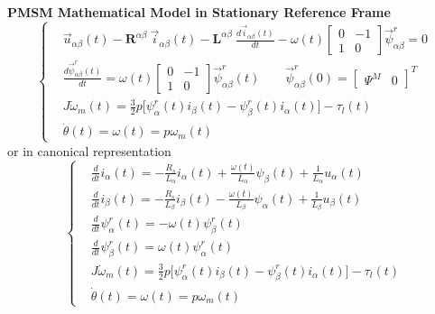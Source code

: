 \documentclass[12pt,a4paper,oneside]{book}
\begin{document}
\begin{onehalfspace}
\begin{mybox}
	\textbf{PMSM Mathematical Model in Stationary Reference Frame}
	\begin{equation}\label{twophase_model_ref}
		\left\lbrace \begin{aligned}
			& \vec{u}_{\alpha\beta}(t)-\mathbf{R}^{\alpha\beta}\ 
			\vec{i}_{\alpha\beta}(t)-\mathbf{L}^{\alpha\beta}\ 
			\frac{d\vec{i}_{\alpha\beta}(t)}{dt}-\omega(t) \begin{bmatrix} 
				0 & -1 \\ 1 & 0\end{bmatrix} \vec{\psi}^r_{\alpha\beta} = 0 
			\\[6pt]
			& \frac{d\vec{\psi}^r_{\alpha\beta}(t)}{dt} = \omega(t) 
			\begin{bmatrix} 0 & -1 \\ 1 & 0\end{bmatrix} 
			\vec{\psi}^r_{\alpha\beta}(t) \qquad 
			\vec{\psi}^r_{\alpha\beta}(0) = \begin{bmatrix} \Psi^M &  0 
			\end{bmatrix}^T \\[6pt]
			& J\dot{\omega}_m(t) = 
			\frac{3}{2}p\Big[\psi^r_{\alpha}(t)i_{\beta}(t)-\psi^r_{\beta}(t)i_{\alpha}(t)\Big]
			-\tau_l(t) \\[6pt]
			& \dot{\theta}(t) = \omega(t) = p\omega_m(t)
		\end{aligned} \right. 
	\end{equation}
	or in canonical representation
	\begin{equation}\label{twophase_model_ref_ab_splitted}
		\left\lbrace \begin{aligned}
			& \frac{d}{dt} i_\alpha(t)= -\frac{R_s}{L_\alpha}i_\alpha(t) 
			+\frac{\omega(t)}{L_\alpha}\psi_\beta(t)+\frac{1}{L_\alpha}u_\alpha(t)
			 \\[6pt]
			& \frac{d}{dt} i_\beta(t)= -\frac{R_s}{L_\beta}i_\beta(t) 
			-\frac{\omega(t)}{L_\beta}\psi_\alpha(t)+\frac{1}{L_\beta}u_\beta(t)
			 \\[6pt]
			&\frac{d}{dt} \psi_\alpha^r(t) = -\omega(t)\psi_\beta^r(t) \\[6pt]
			&\frac{d}{dt} \psi_\beta^r(t) = \omega(t)\psi_\alpha^r(t) \\[6pt]
			& J\dot{\omega}_m(t) = 
			\frac{3}{2}p\Big[\psi^r_{\alpha}(t)i_{\beta}(t)-\psi^r_{\beta}(t)i_{\alpha}(t)\Big]
			-\tau_l(t) \\[6pt]
			& \dot{\theta}(t) = \omega(t) = p\omega_m(t)
		\end{aligned} \right. 
	\end{equation}

\end{mybox}
\end{onehalfspace}
\end{document}
